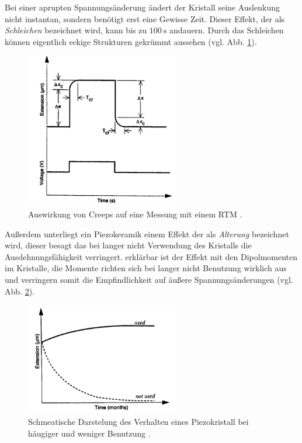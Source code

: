 Bei einer aprupten Spannungsänderung ändert der Kristall seine Auslenkung nicht instantan, sondern benötigt erst eine Gewisse Zeit.
Dieser Effekt, der als \emph{Schleichen} bezeichnet wird, kann bis zu $\SI{100}{\second}$ andauern.
Durch das Schleichen können eigentlich eckige Strukturen gekrümmt aussehen (vgl. Abb. \ref{fig: creep}).
\begin{figure}[h]
  \centering
  \includegraphics[width=0.6\textwidth]{./pics/creep.png}
  \caption{Auswirkung von Creeps auf eine Messung mit einem RTM \cite{rtm}.}
  \label{fig: creep}
\end{figure}
Außerdem unterliegt ein Piezokeramik einem Effekt der als \emph{Alterung} bezeichnet wird, dieser besagt
das bei langer nicht Verwendung des Kristalls die Ausdehnungsfähigkeit verringert. erklärbar ist der Effekt mit den
Dipolmomenten im Kristalle, die Momente richten sich bei langer nicht Benutzung wirklich aus und verringern
somit die Empfindlichkeit auf äußere Spannungsänderungen (vgl. Abb. \ref{fig: ageing}).
\begin{figure}[h]
  \centering
  \includegraphics[width=0.6\textwidth]{./pics/ageing.png}
  \caption{Schmeatische Darstelung des Verhalten eines Piezokristall bei häugiger und weniger Benutzung \cite{rtm}.}
  \label{fig: ageing}
\end{figure}
